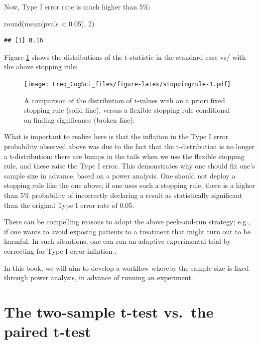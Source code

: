 \documentclass[
  12pt,
]{krantz}
\newenvironment{Shaded}{\begin{snugshade}}{\end{snugshade}}
\newcommand{\DecValTok}[1]{\textcolor[rgb]{0.00,0.00,0.81}{#1}}
\newcommand{\FloatTok}[1]{\textcolor[rgb]{0.00,0.00,0.81}{#1}}
\newcommand{\FunctionTok}[1]{\textcolor[rgb]{0.00,0.00,0.00}{#1}}
\newcommand{\NormalTok}[1]{#1}
\newcommand{\SpecialCharTok}[1]{\textcolor[rgb]{0.00,0.00,0.00}{#1}}
\theoremstyle{definition}
\theoremstyle{definition}
\theoremstyle{definition}
\theoremstyle{definition}
\theoremstyle{remark}
\begin{document}
Now, Type I error rate is much higher than 5\%:

\begin{Shaded}
\begin{Highlighting}[]
\FunctionTok{round}\NormalTok{(}\FunctionTok{mean}\NormalTok{(pvals }\SpecialCharTok{\textless{}} \FloatTok{0.05}\NormalTok{), }\DecValTok{2}\NormalTok{)}
\end{Highlighting}
\end{Shaded}

\begin{verbatim}
## [1] 0.16
\end{verbatim}

Figure \ref{fig:stoppingrule} shows the distributions of the t-statistic in the standard case vs/ with the above stopping rule:

\begin{figure}
\centering
\texttt{[image: Freq\_CogSci\_files/figure-latex/stoppingrule-1.pdf]}
\caption{\label{fig:stoppingrule}A comparison of the distribution of t-values with an a priori fixed stopping rule (solid line), versus a flexible stopping rule conditional on finding significance (broken line).}
\end{figure}

What is important to realize here is that the inflation in the Type I error probability observed above was due to the fact that the t-distribution is no longer a t-distribution: there are bumps in the tails when we use the flexible stopping rule, and these raise the Type I error. This demonstrates why one should fix one's sample size in advance, based on a power analysis. One should not deploy a stopping rule like the one above; if one uses such a stopping rule, there is a higher than 5\% probability of incorrectly declaring a result as statistically significant than the original Type I error rate of 0.05.

There can be compelling reasons to adopt the above peek-and-run strategy; e.g., if one wants to avoid exposing patients to a treatment that might turn out to be harmful. In such situations, one can run an adaptive experimental trial by correcting for Type I error inflation \citep{pocock2013clinical}.

In this book, we will aim to develop a workflow whereby the sample size is fixed through power analysis, in advance of running an experiment.

\hypertarget{the-two-sample-t-test-vs.-the-paired-t-test}{%
\section{The two-sample t-test vs.~the paired t-test}\label{the-two-sample-t-test-vs.-the-paired-t-test}}
\end{document}
